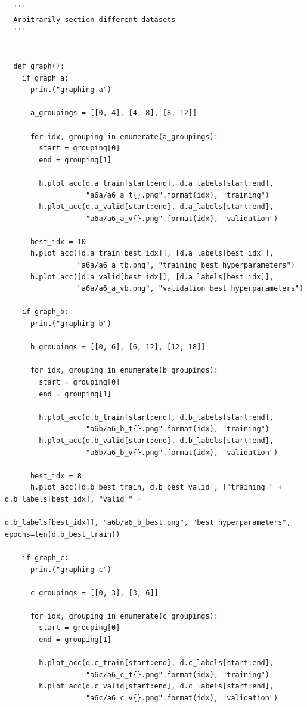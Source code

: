 \documentclass{article}
\newcommand{\1}{\mathbf{1}}
\begin{document}
{\begin{verbatim}
  '''
  Arbitrarily section different datasets
  '''
  
  
  def graph():
    if graph_a:
      print("graphing a")
      
      a_groupings = [[0, 4], [4, 8], [8, 12]]
      
      for idx, grouping in enumerate(a_groupings):
        start = grouping[0]
        end = grouping[1]
  
        h.plot_acc(d.a_train[start:end], d.a_labels[start:end],
                   "a6a/a6_a_t{}.png".format(idx), "training")
        h.plot_acc(d.a_valid[start:end], d.a_labels[start:end],
                   "a6a/a6_a_v{}.png".format(idx), "validation")
  
      best_idx = 10
      h.plot_acc([d.a_train[best_idx]], [d.a_labels[best_idx]],
                 "a6a/a6_a_tb.png", "training best hyperparameters")
      h.plot_acc([d.a_valid[best_idx]], [d.a_labels[best_idx]],
                 "a6a/a6_a_vb.png", "validation best hyperparameters")
  
    if graph_b:
      print("graphing b")
  
      b_groupings = [[0, 6], [6, 12], [12, 18]]
  
      for idx, grouping in enumerate(b_groupings):
        start = grouping[0]
        end = grouping[1]
  
        h.plot_acc(d.b_train[start:end], d.b_labels[start:end],
                   "a6b/a6_b_t{}.png".format(idx), "training")
        h.plot_acc(d.b_valid[start:end], d.b_labels[start:end],
                   "a6b/a6_b_v{}.png".format(idx), "validation")
  
      best_idx = 8
      h.plot_acc([d.b_best_train, d.b_best_valid], ["training " + d.b_labels[best_idx], "valid " +
                                                    d.b_labels[best_idx]], "a6b/a6_b_best.png", "best hyperparameters", epochs=len(d.b_best_train))
  
    if graph_c:
      print("graphing c")
  
      c_groupings = [[0, 3], [3, 6]]
  
      for idx, grouping in enumerate(c_groupings):
        start = grouping[0]
        end = grouping[1]
  
        h.plot_acc(d.c_train[start:end], d.c_labels[start:end],
                   "a6c/a6_c_t{}.png".format(idx), "training")
        h.plot_acc(d.c_valid[start:end], d.c_labels[start:end],
                   "a6c/a6_c_v{}.png".format(idx), "validation")
  

\end{verbatim}}
\end{document}
